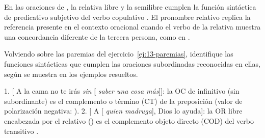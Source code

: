 En las oraciones de , la relativa libre
 y la semilibre  cumplen la
función sintáctica de predicativo subjetivo del verbo copulativo . El
pronombre relativo replica la referencia presente en el contexto oracional
cuando el verbo de la relativa muestra una concordancia diferente de la tercera
persona, como en .

\begin{ejercicio}\label{ej:13-funciones}
Volviendo sobre las paremias del ejercicio~\ref{ej:13-paremias}, identifique las
funciones sintácticas que cumplen las oraciones subordinadas reconocidas en
ellas, según se muestra en los ejemplos resueltos.

\begin{resuelto}
1. [ A la cama no te irás \textit{sin} [ \textit{saber una
cosa más}]]: la OC de infinitivo (sin subordinante) es el complemento o término
(CT) de la preposición  (valor de polarización negativa: ). 2. [ A [ \textit{quien
madruga}], Dios lo ayuda]: la OR libre encabezada por el relativo 
() es el complemento objeto directo (COD) del verbo
transitivo .
\end{resuelto}
\end{ejercicio}

